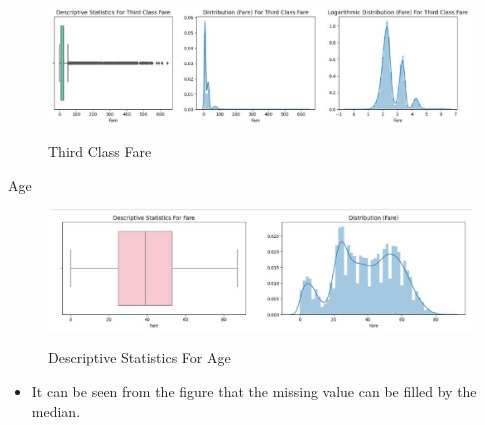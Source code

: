 \documentclass[
size=14pt,
paper=smartboard,  %
mode=present, 		%
display=slides, 	%
style=tuliplab,  	%
pauseslide,
fleqn,leqno]{powerdot}
\begin{document}
	
	\begin{slide}[toc=,bm=]{}
		\vspace{-0.8cm}
		\begin{figure}
			\centering
			\includegraphics[width=1\textwidth]{figures//fig4.eps}\\
			\caption{Third Class Fare}
		\end{figure}
		\vspace{-0.8cm}
		\begin{center}
		\end{center}
	\end{slide}
	
	
	\begin{slide}[toc=,bm=]{}
		Age
		\vspace{-0.8cm}
		\begin{figure}
			\centering
			\includegraphics[width=1\textwidth]{figures//fig5.eps}\\
			\caption{Descriptive Statistics For Age}
		\end{figure}
		\begin{itemize}
			\item
			It can be seen from the figure that the missing value can be filled by the median.
		\end{itemize}
	\end{slide}
	
\end{document}
